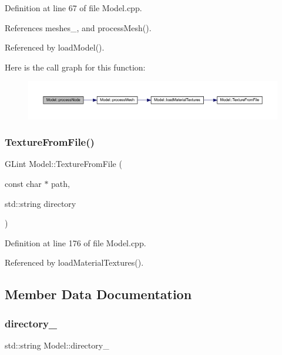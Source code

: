 Definition at line 67 of file Model.\+cpp.



References meshes\+\_\+, and process\+Mesh().



Referenced by load\+Model().

Here is the call graph for this function\+:\nopagebreak
\begin{figure}[H]
\begin{center}
\leavevmode
\includegraphics[width=350pt]{classModel_a23b167ce0d33f7e6ab5693cd5e81a9a5_cgraph}
\end{center}
\end{figure}
\mbox{\label{classModel_a4633dd862f3066d920c2c4177a30310e}} 
\subsubsection{\texorpdfstring{Texture\+From\+File()}{TextureFromFile()}}
{\footnotesize\ttfamily G\+Lint Model\+::\+Texture\+From\+File (\begin{DoxyParamCaption}\item[{const char $\ast$}]{path,  }\item[{std\+::string}]{directory }\end{DoxyParamCaption})\hspace{0.3cm}{\ttfamily [protected]}}



Definition at line 176 of file Model.\+cpp.



Referenced by load\+Material\+Textures().



\subsection{Member Data Documentation}
\mbox{\label{classModel_a2b8d86d272ebf7cd808a02b4d140ca12}} 
\subsubsection{\texorpdfstring{directory\+\_\+}{directory\_}}
{\footnotesize\ttfamily std\+::string Model\+::directory\+\_\+\hspace{0.3cm}{\ttfamily [private]}}



